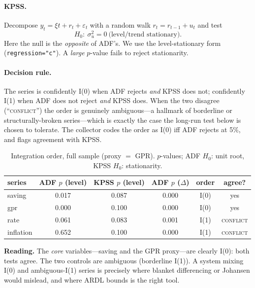 \documentclass[11pt,a4paper]{article}
\newcommand{\code}[1]{\texttt{#1}}
\begin{document}
\paragraph{KPSS.} Decompose $y_t = \xi t + r_t + \varepsilon_t$ with a random
walk $r_t = r_{t-1}+u_t$ and test
\begin{equation}
  H_0:\ \sigma^2_u = 0\ \text{(level/trend stationary)} .
\end{equation}
Here the null is the \emph{opposite} of ADF's. We use the level-stationary form
(\code{regression="c"}). A \emph{large} $p$-value fails to reject stationarity.

\paragraph{Decision rule.} The series is confidently I(0) when ADF rejects
\emph{and} KPSS does not; confidently I(1) when ADF does not reject \emph{and}
KPSS does. When the two disagree (``\textsc{conflict}'') the order is genuinely
ambiguous---a hallmark of borderline or structurally-broken series---which is
exactly the case the long-run test below is chosen to tolerate. The collector
codes the order as I(0) iff ADF rejects at 5\%, and flags agreement with KPSS.

\begin{table}[htbp]\centering
\caption{Integration order, full sample (proxy $=$ GPR). $p$-values; ADF $H_0$:
unit root, KPSS $H_0$: stationarity.}
\label{tab:integ}
\renewcommand{\arraystretch}{1.15}
\begin{tabular}{@{}lccccc@{}}
\toprule
series & ADF $p$ (level) & KPSS $p$ (level) & ADF $p$ ($\Delta$) & order & agree? \\
\midrule
saving    & 0.017 & 0.087 & 0.000 & I(0) & yes \\
gpr       & 0.000 & 0.100 & 0.000 & I(0) & yes \\
rate      & 0.061 & 0.083 & 0.001 & I(1) & \textsc{conflict} \\
inflation & 0.652 & 0.100 & 0.000 & I(1) & \textsc{conflict} \\
\bottomrule
\end{tabular}
\end{table}

\noindent\textbf{Reading.} The \emph{core} variables---saving and the GPR
proxy---are clearly I(0): both tests agree. The two controls are ambiguous
(borderline I(1)). A system mixing I(0) and ambiguous-I(1) series is precisely
where blanket differencing or Johansen would mislead, and where ARDL bounds is
the right tool.
\end{document}

